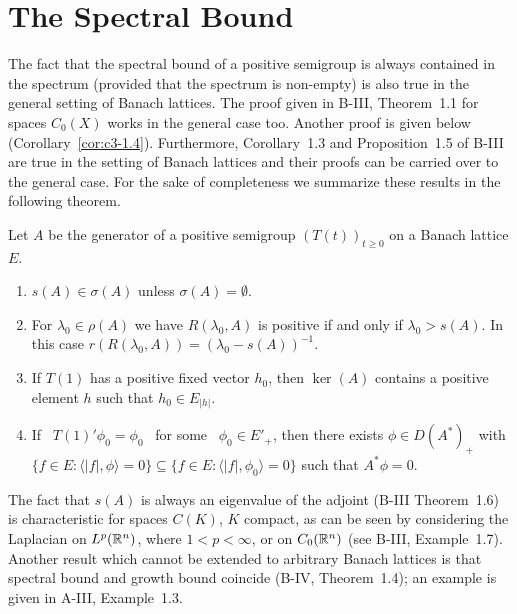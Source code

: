 \section{The Spectral Bound}\label{sec:c3-1}
The fact that the spectral bound of a positive semigroup is always contained in the spectrum (provided that the spectrum is non-empty) is also true in the general setting of Banach lattices.
The proof given in B-III, Theorem~1.1 for spaces $C_{0}(X)$ works in the general case too.
Another proof is given below (\cf Corollary~\ref{cor:c3-1.4}).
Furthermore, Corollary~1.3 and Proposition~1.5 of B-III are true in the setting of Banach lattices and their proofs can be carried over to the general case.
For the sake of completeness we summarize these results in the following theorem.
\begin{theorem}\label{thm:c3-1.1}
Let $A$ be the generator of a positive semigroup $(T(t))_{t \geq 0}$ on a Banach lattice $E$.
	\begin{enumerate}[\upshape (i)]
		\item 
		$s(A) \in \sigma(A)$ unless $\sigma(A) = \emptyset$.
		
		\item 
		For $\lambda_{0} \in \rho(A)$ we have
		$R(\lambda_{0},A)$ is positive if and only if $\lambda_{0} > s(A)$.
		In this case $r(R(\lambda_{0},A)) = (\lambda_{0} - s(A))^{-1}$.
		
		\item 
		If $T(1)$ has a positive fixed vector $h_{0}$, then $\ker(A)$ contains a positive element $h$ such that $h_{0} \in E_{|h|}$.

		\item 
		If \ $T(1)'\phi_{0} = \phi_{0}$ \ for some \ $\phi_{0} \in E'_{+}$, then there exists $\phi \in D(A^*)_{+}$ with $\{f \in E \colon \langle |f|,\phi\rangle = 0\} \subseteq \{f \in E \colon \langle |f|,\phi_{0}\rangle = 0\}$ such that $A^*\phi = 0$.
	\end{enumerate}
\end{theorem}
The fact that $s(A)$ is always an eigenvalue of the adjoint (\cf B-III Theorem~1.6) is characteristic for spaces $C(K)$, $K$ compact, as can be seen by considering the Laplacian on $L^p(\mathbb{R}^n)$, where $1 < p < \infty$, or on $C_{0}(\mathbb{R}^n)$ (see B-III, Example~1.7).
Another result which cannot be extended to arbitrary Banach lattices is that spectral bound and growth bound coincide (\cf B-IV, Theorem~1.4); an example is given in A-III, Example~1.3.
